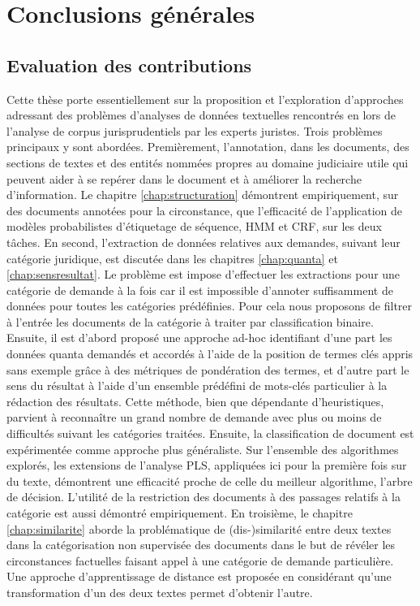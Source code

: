 \chapter*{Conclusions générales}
\label{chap:conclusion}

\section{Evaluation des contributions}
\label{sec:conclusion:contributions}
Cette thèse  porte essentiellement sur la proposition et l'exploration d'approches adressant des problèmes d'analyses de données textuelles rencontrés en lors de l'analyse de corpus jurisprudentiels par les experts juristes. Trois problèmes principaux y sont abordées. Premièrement, l'annotation, dans les documents, des sections de textes et des entités nommées propres au domaine judiciaire utile qui peuvent aider à se repérer dans le document et à améliorer la recherche d'information. Le chapitre \ref{chap:structuration}  démontrent empiriquement, sur des documents annotées pour la circonstance, que l'efficacité de l'application de modèles probabilistes d'étiquetage de séquence, HMM et CRF, sur les deux tâches. En second, l'extraction de données relatives aux demandes, suivant leur catégorie juridique, est discutée dans les chapitres \ref{chap:quanta} et \ref{chap:sensresultat}. Le problème est impose d'effectuer les extractions pour une catégorie de demande à la fois car il est impossible d'annoter suffisamment de données pour toutes les catégories prédéfinies. Pour cela nous proposons de filtrer à l'entrée les documents de la catégorie à traiter par classification binaire. Ensuite, il est d'abord proposé une approche ad-hoc identifiant d'une part les données quanta demandés et accordés à l'aide de la position de termes clés appris sans exemple grâce à des métriques de pondération des termes, et d'autre part le sens du résultat à l'aide d'un ensemble prédéfini de mots-clés particulier à la rédaction des résultats. Cette méthode, bien que dépendante d'heuristiques, parvient à reconnaître un grand nombre de demande avec plus ou moins de difficultés suivant les catégories traitées. Ensuite, la classification de document est expérimentée comme approche plus généraliste. Sur l'ensemble des algorithmes explorés, les extensions de l'analyse PLS, appliquées ici pour la première fois sur du texte, démontrent une efficacité proche de celle du meilleur algorithme, l'arbre de décision.  L'utilité de la restriction des documents à des passages relatifs à la catégorie est aussi démontré empiriquement. En troisième, le chapitre \ref{chap:similarite} aborde la problématique de (dis-)similarité entre deux textes dans la catégorisation non supervisée des documents dans le but de révéler les circonstances factuelles faisant appel à une catégorie de demande particulière. Une approche d'apprentissage de distance est proposée en considérant qu'une transformation d'un des deux textes permet d'obtenir l'autre.

